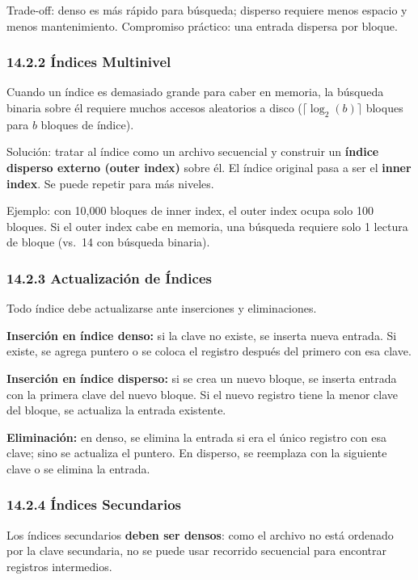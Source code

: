 \documentclass[11pt, a4paper]{article}
\begin{document}
Trade-off: denso es más rápido para búsqueda; disperso requiere menos espacio y menos mantenimiento. Compromiso práctico: una entrada dispersa por bloque.

\subsubsection{14.2.2 Índices Multinivel}

Cuando un índice es demasiado grande para caber en memoria, la búsqueda binaria sobre él requiere muchos accesos aleatorios a disco ($\lceil \log_2(b) \rceil$ bloques para $b$ bloques de índice).

Solución: tratar al índice como un archivo secuencial y construir un \textbf{índice disperso externo (outer index)} sobre él. El índice original pasa a ser el \textbf{inner index}. Se puede repetir para más niveles.

Ejemplo: con 10,000 bloques de inner index, el outer index ocupa solo 100 bloques. Si el outer index cabe en memoria, una búsqueda requiere solo 1 lectura de bloque (vs.\ 14 con búsqueda binaria).

\subsubsection{14.2.3 Actualización de Índices}

Todo índice debe actualizarse ante inserciones y eliminaciones.

\textbf{Inserción en índice denso:} si la clave no existe, se inserta nueva entrada. Si existe, se agrega puntero o se coloca el registro después del primero con esa clave.

\textbf{Inserción en índice disperso:} si se crea un nuevo bloque, se inserta entrada con la primera clave del nuevo bloque. Si el nuevo registro tiene la menor clave del bloque, se actualiza la entrada existente.

\textbf{Eliminación:} en denso, se elimina la entrada si era el único registro con esa clave; sino se actualiza el puntero. En disperso, se reemplaza con la siguiente clave o se elimina la entrada.

\subsubsection{14.2.4 Índices Secundarios}

Los índices secundarios \textbf{deben ser densos}: como el archivo no está ordenado por la clave secundaria, no se puede usar recorrido secuencial para encontrar registros intermedios.
\end{document}

